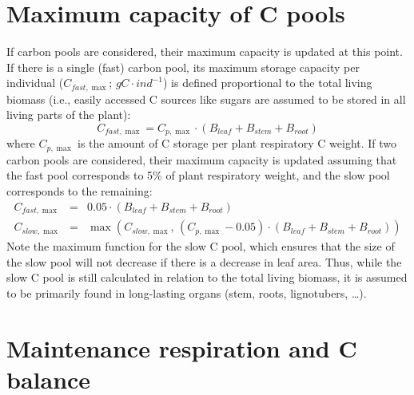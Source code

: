 \documentclass[]{book}
\begin{document}
\hypertarget{maximum-capacity-of-c-pools}{%
\section{Maximum capacity of C pools}\label{maximum-capacity-of-c-pools}}

If carbon pools are considered, their maximum capacity is updated at this point. If there is a single (fast) carbon pool, its maximum storage capacity per individual (\(C_{fast,\max}\); \(g C·ind^{-1}\)) is defined proportional to the total living biomass (i.e., easily accessed C sources like sugars are assumed to be stored in all living parts of the plant):
\begin{equation}
C_{fast,\max} = C_{p,\max} \cdot (B_{leaf} + B_{stem} + B_{root})
\end{equation}
where \(C_{p,\max}\) is the amount of C storage per plant respiratory C weight. If two carbon pools are considered, their maximum capacity is updated assuming that the fast pool corresponds to 5\% of plant respiratory weight, and the slow pool corresponds to the remaining:
\begin{eqnarray}
C_{fast,\max} &=& 0.05 \cdot (B_{leaf} + B_{stem} + B_{root})\\
C_{slow,\max} &=& \max \left(C_{slow,\max},\, (C_{p, \max}-0.05) \cdot (B_{leaf} + B_{stem} + B_{root})\right)
\end{eqnarray}
Note the maximum function for the slow C pool, which ensures that the size of the slow pool will not decrease if there is a decrease in leaf area. Thus, while the slow C pool is still calculated in relation to the total living biomass, it is assumed to be primarily found in long-lasting organs (stem, roots, lignotubers, \ldots{}).

\hypertarget{maintenance-respiration-and-c-balance}{%
\section{Maintenance respiration and C balance}\label{maintenance-respiration-and-c-balance}}
\end{document}
